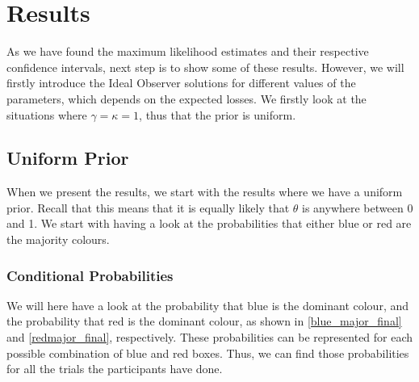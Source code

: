 \chapter{Results}

As we have found the maximum likelihood estimates and their respective confidence intervals, next step is to show some of these results. However, we will firstly introduce the Ideal Observer solutions for different values of the parameters, which depends on the expected losses. We firstly look at the situations where $\gamma=\kappa=1$, thus that the prior is uniform. 

\section{Uniform Prior}
When we present the results, we start with the results where we have a uniform prior. Recall that this means that it is equally likely that $\theta$ is anywhere between 0 and 1. We start with having a look at the probabilities that either blue or red are the majority colours. 

\subsection{Conditional Probabilities}
We will here have a look at the probability that blue is the dominant colour, and the probability that red is the dominant colour, as shown in \eqref{blue_major_final} and \eqref{redmajor_final}, respectively. These probabilities can be represented for each possible combination of blue and red boxes. Thus, we can find those probabilities for all the trials the participants have done. 

